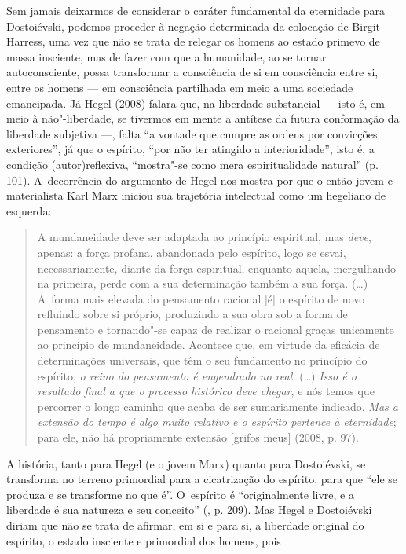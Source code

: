 Sem jamais deixarmos de considerar o caráter fundamental da eternidade
para Dostoiévski, podemos proceder à negação determinada da colocação de
Birgit Harress, uma vez que não se trata de relegar os homens ao estado
primevo de massa insciente, mas de fazer com que a humanidade, ao se
tornar autoconsciente, possa transformar a consciência de si em
consciência entre si, entre os homens --- em consciência partilhada em
meio a uma sociedade emancipada. Já Hegel (2008) falara que, na
liberdade substancial --- isto é, em meio à não"-liberdade, se tivermos em
mente a antítese da futura conformação da liberdade subjetiva ---, falta
``a vontade que cumpre as ordens por convicções exteriores'', já que o
espírito, ``por não ter atingido a interioridade'', isto é, a condição
(autor)reflexiva, ``mostra"-se como mera espiritualidade natural'' (p.
101). A~decorrência do argumento de Hegel nos mostra por que o então
jovem e materialista Karl Marx iniciou sua trajetória intelectual como
um hegeliano de esquerda:

\begin{quote}
A mundaneidade deve ser adaptada ao princípio espiritual, mas
\emph{deve}, apenas: a força profana, abandonada pelo espírito, logo se
esvai, necessariamente, diante da força espiritual, enquanto aquela,
mergulhando na primeira, perde com a sua determinação também a sua
força. (\ldots) A~forma mais elevada do pensamento racional {[}é{]} o
espírito de novo refluindo sobre si próprio, produzindo a sua obra sob a
forma de pensamento e tornando"-se capaz de realizar o racional graças
unicamente ao princípio de mundaneidade. Acontece que, em virtude da
eficácia de determinações universais, que têm o seu fundamento no
princípio do espírito, \emph{o reino do pensamento é engendrado no
real.} (\ldots) \emph{Isso é o resultado final a que o processo histórico
deve chegar}, e nós temos que percorrer o longo caminho que acaba de ser
sumariamente indicado. \emph{Mas a extensão do tempo é algo muito
relativo e o espírito pertence à eternidade}; para ele, não há
propriamente extensão {[}grifos meus{]} (2008, p. 97).
\end{quote}

A história, tanto para Hegel (e o jovem Marx) quanto para Dostoiévski,
se transforma no terreno primordial para a cicatrização do espírito,
para que ``ele se produza e se transforme no que é''. O~espírito é
``originalmente livre, e a liberdade é sua natureza e seu conceito''
(, p. 209). Mas Hegel e Dostoiévski diriam que não se trata de
afirmar, em si e para si, a liberdade original do espírito, o estado
insciente e primordial dos homens, pois

